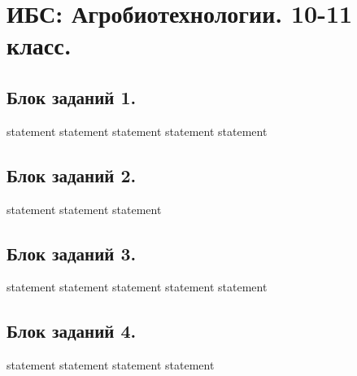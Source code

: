 \chapter{ИБС: Агробиотехнологии. 10-11 класс.}

\section{Блок заданий 1.}

{statement}
{statement}
{statement}
{statement}
{statement}

\section{Блок заданий 2.}

{statement}
{statement}
{statement}

\section{Блок заданий 3.}

{statement}
{statement}
{statement}
{statement}
{statement}

\section{Блок заданий 4.}

{statement}
{statement}
{statement}
{statement}